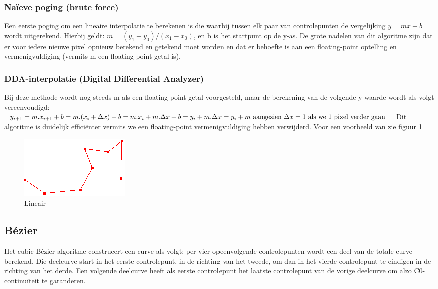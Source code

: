 \documentclass[a4paper,11pt,oneside, titlepage]{article}
\begin{document}
\subsubsection{Na\"ieve poging (brute force) \label{snp1}}
Een eerste poging om een lineaire interpolatie te berekenen is die waarbij tussen elk paar van controlepunten
de vergelijking \begin{math}y = mx + b\end{math} wordt uitgerekend.
Hierbij geldt: \begin{math}m = (y_1-y_0)/(x_1-x_0)\end{math}, en b is het
startpunt op de y-as. De grote nadelen van dit algoritme zijn dat er voor iedere nieuwe
pixel opnieuw berekend en getekend moet worden en dat er behoefte is aan een floating-point optelling en 
vermenigvuldiging (vermits m een floating-point getal is).
\subsubsection{DDA-interpolatie (Digital Differential Analyzer) \label{sdda}}
Bij deze methode wordt nog steeds m als een floating-point getal voorgesteld, maar de berekening van
de volgende y-waarde wordt als volgt vereenvoudigd:
\begin{math}
y_{i+1} = m.x_{i+1} + b\newline
= m.(x_i + \Delta x) + b\newline
= m.x_i + m.\Delta x + b\newline
= y_i + m.\Delta x\newline
= y_i + m \textrm{ aangezien } \Delta x = 1 \textrm{ als we 1 pixel verder gaan } \newline
\end{math}
Dit algoritme is duidelijk effici\"enter vermits we een floating-point vermenigvuldiging hebben 
verwijderd. Voor een voorbeeld van zie figuur \ref{lineair}
\begin{figure}[htbp]
\centering
\includegraphics[scale=0.4]{./screenies2/lineair.png}
\caption{Lineair}\label{lineair}
\end{figure}
\subsection{B\'ezier \label{sb}}
Het cubic Bézier-algoritme construeert een curve als volgt: per vier opeenvolgende controlepunten wordt een deel van de totale curve berekend.
Die deelcurve start in het eerste controlepunt, in de richting van het tweede, om dan in het vierde controlepunt te eindigen in de richting van het derde. Een volgende 
deelcurve heeft als eerste controlepunt het laatste controlepunt van de vorige deelcurve om alzo C0-continu\"iteit te garanderen.
\end{document}

